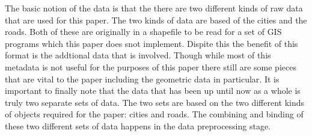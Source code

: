 \documentclass[midd]{thesis}
\newcommand{\tab}{\hspace*{2em}}
\begin{document}
\tab The basic notion of the data is that the there are two different kinds of raw data that are used for this paper. The two kinds of data are based of the cities and the roads. Both of these are originally in a shapefile to be read for a set of GIS programs which this paper does snot implement. Dispite this the benefit of this format is the addtional data that is involved. Though while most of this metadata is not useful for the purposes of this paper there still are some pieces that are vital to the paper including the geometric data in particular. It is important to finally note that the data that has been up until now as a whole is truly two separate sets of data. The two sets are based on the two different kinds of objects required for the paper: cities and roads. The combining and binding of these two different sets of data happens in the data preprocessing stage.
\end{document}
